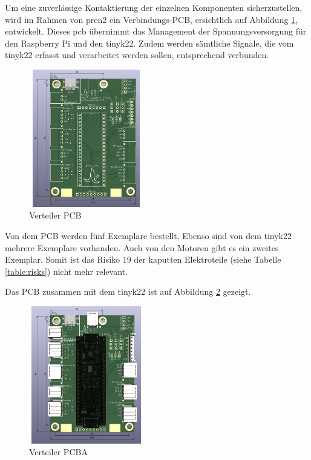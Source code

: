 Um eine zuverlässige Kontaktierung der einzelnen Komponenten sicherzustellen, wird im Rahmen von \acrshort{pren2} ein Verbindungs-PCB, ersichtlich auf Abbildung \ref{fig: Verteiler PCB}, entwickelt. Dieses \acrshort{pcb} übernimmt das Management der
Spannungsversorgung für den Raspberry Pi und den \gls{tinyk22}. Zudem werden sämtliche Signale,
die vom \gls{tinyk22} erfasst und verarbeitet werden sollen, entsprechend verbunden.

\begin{figure}[H]
\centering
\includegraphics[width=5cm, height=6cm]{assets/ET/PCB/VerteilerPCB_unbestueckt.png}
\caption{Verteiler PCB}
\label{fig: Verteiler PCB}
\end{figure}

Von dem PCB werden fünf Exemplare bestellt. Ebenso sind von dem \gls{tinyk22} mehrere Exemplare vorhanden. Auch von den Motoren gibt es ein zweites Exemplar. Somit ist das Risiko 19 der kaputten Elektroteile (siehe Tabelle \ref{table:risks}) nicht mehr relevant.

Das PCB zusammen mit dem \gls{tinyk22} ist auf Abbildung \ref{fig: Verteiler PCBA} gezeigt. 

\begin{figure}[H]
\centering
\includegraphics[width=5cm, height=6cm]{assets/ET/PCB/VerteilerPCB_bestueckt.png}
\caption{Verteiler PCBA}
\label{fig: Verteiler PCBA}
\end{figure}


